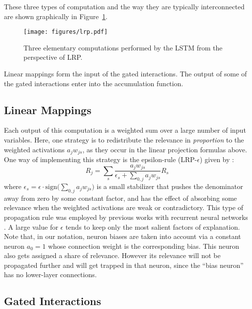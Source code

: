 \documentclass[runningheads]{llncs}
\begin{document}
These three types of computation and the way they are typically interconnected are shown graphically in Figure~\ref{Arr:fig:lrp}.
\begin{figure}
    \centering
    \texttt{[image: figures/lrp.pdf]}
    \caption{Three elementary computations performed by the LSTM from the perspective of LRP.}
    \label{Arr:fig:lrp}
\end{figure}

Linear mappings form the input of the gated interactions. The output of some of the gated interactions enter into the accumulation function.

\subsection{Linear Mappings}
\label{Arr:sec:LRP_linear_mappings}

Each output of this computation is a weighted sum over a large number of input variables. Here, one strategy is to redistribute the relevance in {\it proportion} to the weighted activations $a_j w_{js}$, as they occur in the linear projection formulas above. One way of implementing this strategy is the epsilon-rule (LRP-$\epsilon$) given by \cite{Arr:Bach:15}:
$$
R_j = \sum_s \frac{a_j w_{js}}{\epsilon_s + \sum_{0,j} a_j w_{js}} R_s
$$
where $\epsilon_s  = \epsilon \cdot  \mathrm{sign}\big(\sum_{0,j} a_j w_{js}\big)$ is a small stabilizer that pushes the denominator away from zero by some constant factor, and  has the effect of absorbing some relevance when the weighted activations are weak or contradictory. This type of propagation rule was employed by previous works with recurrent neural networks \cite{Arr:Arjona-Medina:18,Arr:Arras:17,Arr:Ding:ACL2017,Arr:Poerner:ACL2018,Arr:Yang:ICHI2018}. A large value for $\epsilon$ tends to keep only the most salient factors of explanation.
Note that, in our notation, neuron biases are taken into account via a constant neuron $a_0 = 1$ whose connection weight is the corresponding bias. This neuron also gets assigned a share of relevance. However its relevance will not be propagated further and will get trapped in that neuron, since the ``bias neuron'' has no lower-layer connections.

\subsection{Gated Interactions}
\label{Arr:sec:LRP_gated_interactions}
\end{document}
